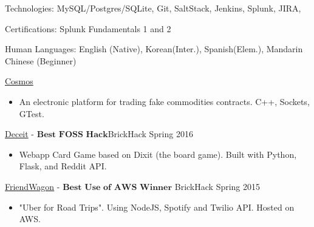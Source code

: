 \documentclass[11pt]{article}
\begin{document}
\inlineskillsection
{Technologies:}
{ MySQL/Postgres/SQLite, Git, SaltStack, Jenkins, Splunk, JIRA, \latex }

\inlineskillsection
{Certifications:}
{Splunk Fundamentals 1 and 2}

\inlineskillsection
{Human Languages:}
{English (Native), Korean(Inter.), Spanish(Elem.), Mandarin Chinese (Beginner)}


\nobreakvspace{0.3em}  %


\spacedhrule{0.1em}{0.5em}  %

\projects
{{\href{https://github.com/gabeochoa/Cosmos}{Cosmos}}}{}
{
    \begin{itemize}[label={}]
        \setlength\itemsep{.005ex}
        \item{An electronic platform for trading fake commodities contracts. C++, Sockets, GTest.}
    \end{itemize}
}

\projects
{{\href{https://github.com/gabeochoa/sokim}{Deceit}} - $\textbf{Best FOSS Hack}$}{BrickHack Spring 2016}
{
    \begin{itemize}[label={}]
        \setlength\itemsep{.005ex}
        \item{Webapp Card Game based on Dixit (the board game). Built with Python, Flask, and Reddit API.}
    \end{itemize}
}

\headedsubsection
{{\href{https://github.com/alanplotko/RoadTrip}{FriendWagon}} - $\textbf{Best Use of AWS Winner}$ }
{BrickHack Spring 2015}
{
    \begin{itemize}[label={}]
    	\setlength\itemsep{.005ex}
        \item{"Uber for Road Trips". Using NodeJS, Spotify and Twilio API. Hosted on AWS.}
    \end{itemize}
}
\end{document}
